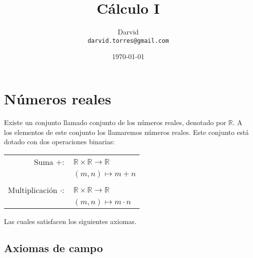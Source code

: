 \documentclass[11pt]{article}
\begin{document}
\title{\vspace{-2cm}Cálculo I}
\author{Darvid \\ \texttt{darvid.torres@gmail.com}}
\date{\today}
\maketitle
\thispagestyle{empty}

\section*{Números reales}

Existe un conjunto llamado conjunto de los números reales, denotado por $\mathbb{R}$. A los elementos de este conjunto los llamaremos números reales. Este conjunto está dotado con dos operaciones binarias:

\begin{center} \begin{tabular}{rl}
    Suma $+:$ & $ \mathbb{R} \times \mathbb{R} \to \mathbb{R} $ \\
    & $ (m, n) \mapsto m+n $\\
    \\
    Multiplicación $\cdot:$ & $ \mathbb{R} \times \mathbb{R} \to \mathbb{R} $ \\
    & $ (m, n) \mapsto m\cdot n $
\end{tabular} \end{center}

Las cuales satisfacen los siguientes axiomas.

\subsection*{Axiomas de campo}
\end{document}
